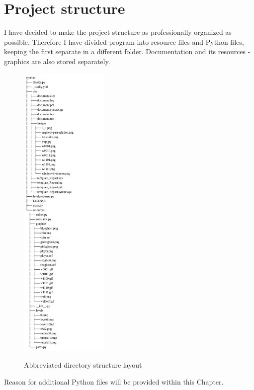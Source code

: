 \documentclass[11pt,a4paper]{report}
\newenvironment{img}{
	\begin{center}
		\begin{figure}[H]
			\begin{center}
			
}{
	\end{center}
		\end{figure}
			\end{center}
}
\begin{document}
		\section{Project structure}
			I have decided to make the project structure as professionally organized as possible. Therefore I have divided program into resource files and Python files, keeping the first separate in a different folder. Documentation and its resources - graphics are also stored separately.
			\begin{img}
				\includegraphics[width=120pt]{images/directory_structure}\\
				\caption{Abbreviated directory structure layout}
			\end{img}
			Reason for additional Python files will be provided within this Chapter.
\end{document}
